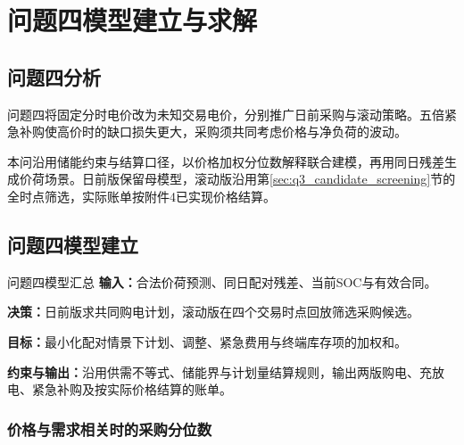 \section{问题四模型建立与求解}
\label{sec:question4}

\subsection{问题四分析}

问题四将固定分时电价改为未知交易电价，分别推广日前采购与滚动策略。五倍紧急补购使高价时的缺口损失更大，采购须共同考虑价格与净负荷的波动。

本问沿用储能约束与结算口径，以价格加权分位数解释联合建模，再用同日残差生成价荷场景。日前版保留母模型，滚动版沿用第\ref{sec:q3_candidate_screening}节的全时点筛选，实际账单按附件4已实现价格结算。

\subsection{问题四模型建立}

\begin{modelsummary}{问题四模型汇总}
\textbf{输入：}合法价荷预测、同日配对残差、当前SOC与有效合同。\par
\textbf{决策：}日前版求共同购电计划，滚动版在四个交易时点回放筛选采购候选。\par
\textbf{目标：}最小化配对情景下计划、调整、紧急费用与终端库存项的加权和。\par
\textbf{约束与输出：}沿用供需不等式、储能界与计划量结算规则，输出两版购电、充放电、紧急补购及按实际价格结算的账单。
\end{modelsummary}

\subsubsection{价格与需求相关时的采购分位数}

